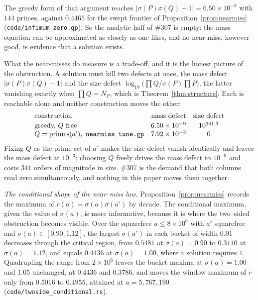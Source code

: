 \documentclass[11pt]{article}
\theoremstyle{definition}
\begin{document}
The greedy form of that argument reaches $|\sigma(P)\sigma(Q)-1|=6.50\times10^{-9}$ with $144$
primes, against $0.4465$ for the swept frontier of Proposition~\ref{prop:nearmiss}
\textup{(\texttt{code/infimum\_zero.gp})}. So the analytic half of \#307 is empty: the mass equation
can be approximated as closely as one likes, and no near-miss, however good, is evidence that a
solution exists.

What the near-misses do measure is a trade-off, and it is the honest picture of the obstruction. A
solution must kill two defects at once, the mass defect $|\sigma(P)\sigma(Q)-1|$ and the size defect
$\log_{10}\bigl(\prod Q\big/\sigma(P)\prod P\bigr)$, the latter vanishing exactly when
$\prod Q=N_P$, which is Theorem~\ref{thm:structure}. Each is reachable alone and neither
construction moves the other:
\[
\begin{array}{lcc}
\text{construction} & \text{mass defect} & \text{size defect}\\[2pt]
\text{greedy, } Q \text{ free} & 6.50\times10^{-9} & 10^{341.3}\\
Q=\text{primes}(a'),\ \text{\texttt{nearmiss\_tune.gp}} & 7.92\times10^{-3} & 0
\end{array}
\]
Fixing $Q$ as the prime set of $a'$ makes the size defect vanish identically and leaves the mass
defect at $10^{-3}$; choosing $Q$ freely drives the mass defect to $10^{-9}$ and costs $341$ orders
of magnitude in size. \#307 is the demand that both columns read zero simultaneously, and nothing in
this paper moves them together.

\emph{The conditional shape of the near--miss law.} Proposition~\ref{prop:nearmiss} records the
maximum of $r(a)=\sigma(a)\sigma(a')$ by decade. The conditional maximum, given the value of
$\sigma(a)$, is more informative, because it is where the two--sided obstruction becomes visible.
Over the squarefree $a\le8\times10^{6}$ with $a'$ squarefree and $\sigma(a)\in[0.90,1.12]$, the
largest $\sigma(a')$ in each bucket of width $0.01$ decreases through the critical region, from
$0.5481$ at $\sigma(a)=0.90$ to $0.3110$ at $\sigma(a)=1.12$, and equals $0.4436$ at
$\sigma(a)=1.00$, where a solution requires $1$. Quadrupling the range from $2\times10^{6}$ leaves
the bucket maxima at $\sigma(a)=1.00$ and $1.05$ unchanged, at $0.4436$ and $0.3786$, and moves the
window maximum of $r$ only from $0.5016$ to $0.4955$, attained at $a=5{,}767{,}190$
\textup{(\texttt{code/twoside\_conditional.rs})}.
\end{document}
